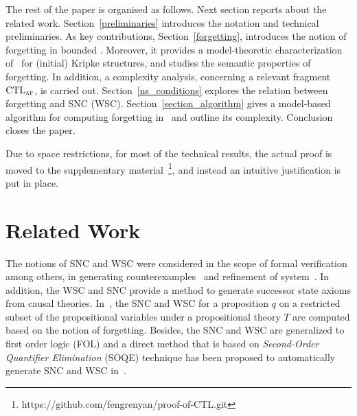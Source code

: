 \documentclass{article}
\begin{document}
  The rest of the paper is organised as follows. Next section reports about the related work. Section~\ref{preliminaries} introduces the notation and technical preliminaries. As key contributions, Section~\ref{forgetting}, introduces the notion of forgetting in bounded \CTL. Moreover, it provides a model-theoretic characterization of \CTL\  for (initial) Kripke structures, and studies the semantic properties of forgetting. In addition, a complexity analysis, concerning a relevant fragment  $\textrm{CTL}_{\textsc{a}\textsc{f}}$, is carried out.
Section~\ref{ns_conditions} explores the relation between forgetting and SNC (WSC). Section~\ref{section_algorithm} gives a model-based algorithm for computing forgetting in \CTL\ and outline its complexity. Conclusion closes the paper.

Due to space restrictions, for most of the technical results, the actual proof is moved to the supplementary material~\footnote{https://github.com/fengrenyan/proof-of-CTL.git}, and instead an intuitive justification is put in place.

\section{Related Work}\label{related_work}
The notions of SNC and WSC were considered in the scope of formal verification among others,  in generating counterexamples~\cite{dailler2018instrumenting} and refinement of  system~\cite{woodcock1990refinement}.
In addition, the WSC and SNC provide a method to generate successor state axioms from causal theories. %
In~\cite{DBLP:Lin:AIJ:2001}, the SNC and WSC for a proposition $q$ on a restricted subset of the propositional variables under
a propositional theory $T$ are computed based on the notion of forgetting.
Besides, the SNC and WSC are generalized to first order logic (FOL) and a direct method that is based
on \emph{Second-Order Quantifier Elimination} (SOQE) technique has been proposed to automatically generate SNC and WSC in~\cite{doherty2001computing}.
\end{document}
